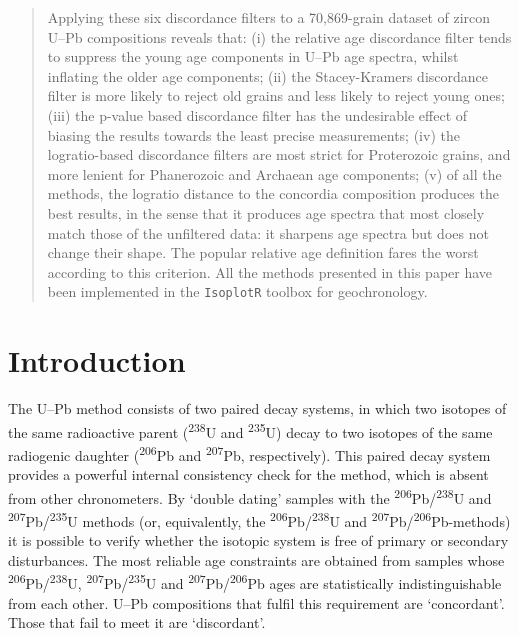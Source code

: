 \documentclass{article}
\begin{document}
\begin{abstract}
  Applying these six discordance filters to a 70,869-grain dataset of
  zircon U--Pb compositions reveals that: (i) the relative age
  discordance filter tends to suppress the young age components in
  U--Pb age spectra, whilst inflating the older age components; (ii)
  the Stacey-Kramers discordance filter is more likely to reject old
  grains and less likely to reject young ones; (iii) the p-value based
  discordance filter has the undesirable effect of biasing the results
  towards the least precise measurements; (iv) the logratio-based
  discordance filters are most strict for Proterozoic grains, and more
  lenient for Phanerozoic and Archaean age components; (v) of all the
  methods, the logratio distance to the concordia composition produces
  the best results, in the sense that it produces age spectra that
  most closely match those of the unfiltered data: it sharpens age
  spectra but does not change their shape. The popular relative age
  definition fares the worst according to this criterion.  All the
  methods presented in this paper have been implemented in the
  \texttt{IsoplotR} toolbox for geochronology.
\end{abstract}



\section{Introduction}  %
\label{sec:intro}

The U--Pb method consists of two paired decay systems, in which two
isotopes of the same radioactive parent (\textsuperscript{238}U and
\textsuperscript{235}U) decay to two isotopes of the same radiogenic
daughter (\textsuperscript{206}Pb and \textsuperscript{207}Pb,
respectively). This paired decay system provides a powerful internal
consistency check for the method, which is absent from other
chronometers. By `double dating' samples with the
\textsuperscript{206}Pb/\textsuperscript{238}U and
\textsuperscript{207}Pb/\textsuperscript{235}U methods (or,
equivalently, the \textsuperscript{206}Pb/\textsuperscript{238}U and
\textsuperscript{207}Pb/\textsuperscript{206}Pb-methods) it is
possible to verify whether the isotopic system is free of primary or
secondary disturbances. The most reliable age constraints are obtained
from samples whose \textsuperscript{206}Pb/\textsuperscript{238}U,
\textsuperscript{207}Pb/\textsuperscript{235}U and
\textsuperscript{207}Pb/\textsuperscript{206}Pb ages are statistically
indistinguishable from each other. U--Pb compositions that fulfil this
requirement are `concordant'. Those that fail to meet it are
`discordant'.
\end{document}
